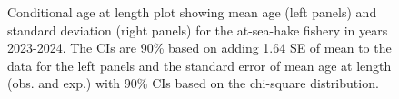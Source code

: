 \documentclass[
]{scrartcl}
\begin{document}
\begin{figure}[H]


\caption{\label{fig-call-plot-ashop3}Conditional age at length plot
showing mean age (left panels) and standard deviation (right panels) for
the at-sea-hake fishery in years 2023-2024. The CIs are 90\% based on
adding 1.64 SE of mean to the data for the left panels and the standard
error of mean age at length (obs. and exp.) with 90\% CIs based on the
chi-square distribution.}

\end{figure}%
\end{document}
